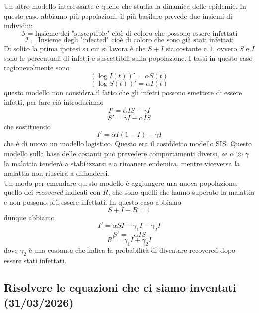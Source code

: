 \documentclass[11pt]{scrartcl}
\begin{document}
	Un altro modello interessante è quello che studia la dinamica delle epidemie. In questo caso abbiamo più popolazioni, il più basilare prevede due insiemi di individui:
	$$\mathcal{S}=\text{Insieme dei "susceptible" cioè di coloro che possono essere infettati}$$
	$$\mathcal{I}=\text{Insieme degli "infected" cioè di coloro che sono già stati infettati}$$
	Di solito la prima ipotesi su cui si lavora è che $S+I$ sia costante a $1$, ovvero $S$ e $I$ sono le percentuali di infetti e suscettibili sulla popolazione. I tassi in questo caso ragionevolmente sono
	$$\left(\log I(t)\right)'=\alpha S(t)$$
	$$\left(\log S(t)\right)'=\alpha I(t)$$
	questo modello non considera il fatto che gli infetti possono smettere di essere infetti, per fare ciò introduciamo
	$$I'=\alpha IS-\gamma I$$
	$$S'=\gamma I -\alpha IS$$
	che sostituendo
	$$I'=\alpha I(1-I)-\gamma I$$
	che è di nuovo un modello logistico. Questo era il cosiddetto modello SIS. Questo modello sulla base delle costanti può prevedere comportamenti diversi, se $\alpha \gg \gamma$ la malattia tenderà a stabilizzarsi e a rimanere endemica, mentre viceversa la malattia non riuscirà a diffondersi. 
	\\
	Un modo per emendare questo modello è aggiungere una nuova popolazione, quello dei \textit{recovered} indicati con $R$, che sono quelli che hanno superato la malattia e non possono più essere infettati. In questo caso abbiamo
	$$S+I+R=1$$
	dunque abbiamo
	$$I'=\alpha SI -\gamma_1 I -\gamma_2 I$$
	$$S'=-\alpha IS$$
	$$R'=\gamma_1 I + \gamma_2 I$$
	dove $\gamma_2$ è una costante che indica la probabilità di diventare recovered dopo essere stati infettati.
	
	\subsection{Risolvere le equazioni che ci siamo inventati (31/03/2026)}
	
\end{document}
